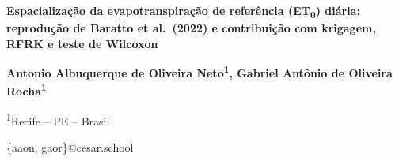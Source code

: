 \titleformat{\subsection}{\normalfont\fontsize{12}{14}\bfseries}{\thesubsection}{0.5em}{}
\titlespacing*{\section}{0pt}{12pt}{6pt}
\titlespacing*{\subsection}{0pt}{10pt}{4pt}


\newenvironment{sbcabstract}
  {\par\vspace{6pt}\begingroup\setlength{\leftskip}{0.8cm}\setlength{\rightskip}{0.8cm}\noindent}
  {\par\endgroup\vspace{6pt}}

\newcommand{\refitem}[1]{\par\vspace{6pt}\noindent\hangindent=0.5cm\hangafter=1 #1\par}



\begin{center}
  {\fontsize{16}{19}\selectfont\bfseries
   Espacialização da evapotranspiração de referência (ET\textsubscript{0})
   diária: reprodução de Baratto et al.\ (2022) e contribuição com krigagem,
   RFRK e teste de Wilcoxon\par}

  \vspace{12pt}
  {\fontsize{12}{14}\selectfont\bfseries
   Antonio Albuquerque de Oliveira Neto\textsuperscript{1},
   Gabriel Antônio de Oliveira Rocha\textsuperscript{1}\par}

  \vspace{12pt}
  {\fontsize{12}{14}\selectfont
   \textsuperscript{1}Recife -- PE -- Brasil\par}

  \vspace{6pt}
  {\footnotesize\ttfamily \{aaon, gaor\}@cesar.school\par}
\end{center}


